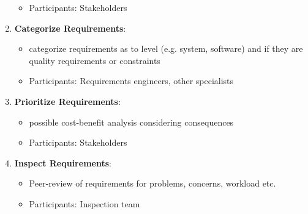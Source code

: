 \documentclass[12pt,A4]{extarticle}
\begin{document}
\begin{enumerate}
{\begin{itemize}
      \item{Participants: Stakeholders}
    \end{itemize}
  }
  \item{\textbf{Categorize Requirements}:
    \begin{itemize}
      \item{categorize requirements as to level (e.g. system, software) and if they are quality requirements or constraints}
      \item{Participants: Requirements engineers, other specialists}
    \end{itemize}
  }
  \item{\textbf{Prioritize Requirements}:
    \begin{itemize}
      \item{possible cost-benefit analysis considering consequences}
      \item{Participants: Stakeholders}
    \end{itemize}
  }
  \item{\textbf{Inspect Requirements}:
    \begin{itemize}
      \item{Peer-review of requirements for problems, concerns, workload etc.}
      \item{Participants: Inspection team}
    \end{itemize}
  }
\end{enumerate}

\newpage


\end{document}
